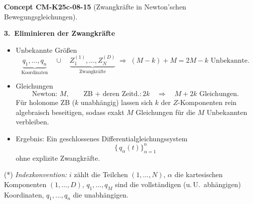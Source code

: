 \documentclass[10pt, letterpaper]{article}
\newcommand{\CustomHeading}[3]{%
  \par\medskip\noindent%
  \textbf{#1 #2} \textnormal{(#3)}.\enskip%
}
\newenvironment{CONC}[2]{\CustomHeading{Concept}{#1}{#2}}{}
\begin{document}
\begin{CONC}{CM-K25c-08-15}{Zwangkräfte in Newton'schen Bewegungsgleichungen}
\textbf{3.\ Eliminieren der Zwangkräfte}
\begin{itemize}
  \item Unbekannte Größen  
        \[
          \underbrace{q_1,\dots,q_{n}}_{\text{Koordinaten}}
          \quad\cup\quad
          \underbrace{Z_{1}^{(1)},\dots,Z_{N}^{(D)}}_{\text{Zwangkräfte}}
          \;\Longrightarrow\;
          (M-k)+M = 2M-k \text{ Unbekannte.}
        \]
  \item Gleichungen  
        \[
          \text{Newton: } M,\qquad
          \text{ZB + deren Zeitd.}: 2k
          \quad\Longrightarrow\quad
          M+2k \text{ Gleichungen.}
        \]
        Für holonome ZB ($k$ unabhängig) lassen sich $k$ der 
        $Z$-Komponenten rein algebraisch beseitigen, sodass exakt
        $M$ Gleichungen für die $M$ Unbekannten verbleiben.
  \item Ergebnis: Ein geschlossenes Differentialgleichungssystem
        \[
          \bigl\{\,q_\alpha(t)\bigr\}_{\alpha=1}^{n}
        \]
        ohne explizite Zwangkräfte.
\end{itemize}

\medskip
\noindent
(*) \emph{Indexkonvention:} $i$ zählt die Teilchen $(1,\dots,N)$,
$\alpha$ die kartesischen Komponenten $(1,\dots,D)$,
$q_1,\dots,q_M$ sind die vollständigen (u.\,U.\ abhängigen)
Koordinaten, $q_1,\dots,q_n$ die unabhängigen.
\end{CONC}
\end{document}
